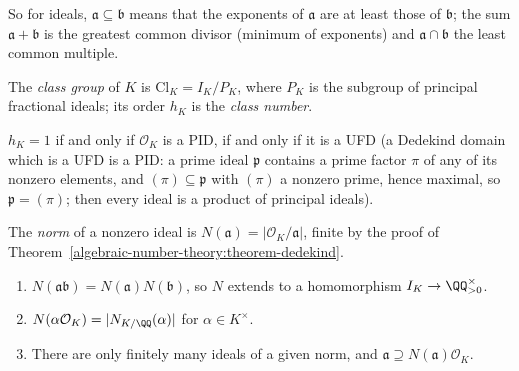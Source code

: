 So for ideals, $\mathfrak{a} \subseteq \mathfrak{b}$ means that the exponents of $\mathfrak{a}$ are at least those of $\mathfrak{b}$; the sum $\mathfrak{a} + \mathfrak{b}$ is the greatest common divisor (minimum of exponents) and
$\mathfrak{a} \cap \mathfrak{b}$ the least common multiple.

\begin{definition}\label{algebraic-number-theory:definition-class-group}
The \emph{class group} of $K$ is $\mathrm{Cl}_K = I_K/P_K$, where $P_K$ is the subgroup of principal fractional ideals; its order $h_K$ is the \emph{class number}.
\end{definition}

$h_K = 1$ if and only if $\mathcal{O}_K$ is a PID, if and only if it is a UFD (a Dedekind domain which is a UFD is a PID: a prime ideal $\mathfrak{p}$ contains a prime factor $\pi$ of any of its nonzero
elements, and $(\pi) \subseteq \mathfrak{p}$ with $(\pi)$ a nonzero prime, hence maximal, so $\mathfrak{p} = (\pi)$; then every ideal is a product of principal ideals).

\begin{definition}\label{algebraic-number-theory:definition-ideal-norm}
The \emph{norm} of a nonzero ideal is $N(\mathfrak{a}) = |\mathcal{O}_K/\mathfrak{a}|$, finite by the proof of Theorem~\ref{algebraic-number-theory:theorem-dedekind}.
\end{definition}

\begin{proposition}\label{algebraic-number-theory:proposition-ideal-norm}
\begin{enumerate}
\item $N(\mathfrak{a}\mathfrak{b}) = N(\mathfrak{a})N(\mathfrak{b})$, so $N$ extends to a homomorphism $I_K \to \QQ_{>0}^\times$.
\item $N(\alpha\mathcal{O}_K) = |N_{K/\QQ}(\alpha)|$ for $\alpha \in K^\times$.
\item There are only finitely many ideals of a given norm, and $\mathfrak{a} \supseteq N(\mathfrak{a})\mathcal{O}_K$.
\end{enumerate}
\end{proposition}

